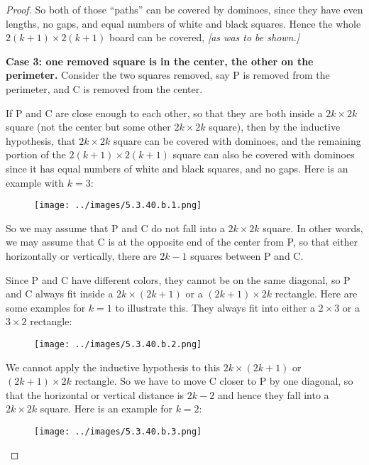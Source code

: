\documentclass[14pt]{extarticle}
\begin{document}
\begin{proof}
    So both of those ``paths'' can be covered by dominoes, since they have even lengths, no gaps, and equal numbers of white and black squares. Hence the whole $2(k+1) \times 2(k+1)$ board can be covered, {\it [as was to be shown.]}

        {\bf Case 3: one removed square is in the center, the other on the perimeter.} Consider the two squares removed, say P is removed from the perimeter, and C is removed from the center.

    If P and C are close enough to each other, so that they are both inside a $2k \times 2k$ square (not the center but some other $2k \times 2k$ square), then by the inductive hypothesis, that $2k \times 2k$ square can be covered with dominoes, and the remaining portion of the $2(k+1) \times 2(k+1)$ square can also be covered with dominoes since it has equal numbers of white and black squares, and no gaps. Here is an example with $k = 3$:

    \begin{figure}[ht!]
        \centering
        \texttt{[image: ../images/5.3.40.b.1.png]}
    \end{figure}

    So we may assume that P and C do not fall into a $2k \times 2k$ square. In other words, we may assume that C is at the opposite end of the center from P, so that either horizontally or vertically, there are $2k-1$ squares between P and C.

    Since P and C have different colors, they cannot be on the same diagonal, so P and C always fit inside a $2k \times (2k+1)$ or a $(2k+1) \times 2k$ rectangle. Here are some examples for $k = 1$ to illustrate this. They always fit into either a $2 \times 3$ or a $3 \times 2$ rectangle:

    \begin{figure}[ht!]
        \centering
        \texttt{[image: ../images/5.3.40.b.2.png]}
    \end{figure}

    We cannot apply the inductive hypothesis to this $2k \times (2k+1)$ or $(2k+1) \times 2k$ rectangle. So we have to move C closer to P by one diagonal, so that the horizontal or vertical distance is $2k-2$ and hence they fall into a $2k \times 2k$ square. Here is an example for $k = 2$:

    \begin{figure}[ht!]
        \centering
        \texttt{[image: ../images/5.3.40.b.3.png]}
    \end{figure}


\end{proof}
\end{document}
